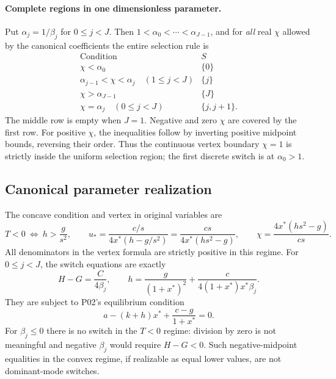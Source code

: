\paragraph{Complete regions in one dimensionless parameter.}
Put $\alpha_j=1/\beta_j$ for $0\le j<J$. Then
$1<\alpha_0<\cdots<\alpha_{J-1}$, and for \emph{all} real $\chi$
allowed by the canonical coefficients the entire selection rule is
\begin{equation}
 \begin{array}{c|c}
 \text{Condition}&S\\\hline
 \chi<\alpha_0&\{0\}\\
 \alpha_{j-1}<\chi<\alpha_j\quad(1\le j<J)&\{j\}\\
 \chi>\alpha_{J-1}&\{J\}\\
 \chi=\alpha_j\quad(0\le j<J)&\{j,j+1\}.
 \end{array}
 \label{eq:P05-regions}
\end{equation}
The middle row is empty when $J=1$. Negative and zero $\chi$ are covered
by the first row. For positive $\chi$, the inequalities follow by inverting
positive midpoint bounds, reversing their order. Thus the continuous
vertex boundary $\chi=1$ is strictly inside the uniform selection region;
the first discrete switch is at $\alpha_0>1$.

\subsection{Canonical parameter realization}

The concave condition and vertex in original variables are
\begin{equation}
 T<0\ \Longleftrightarrow\ h>\frac{g}{s^2},\qquad
 u_*=\frac{c/s}{4x^*(h-g/s^2)}
     =\frac{cs}{4x^*(hs^2-g)},\qquad
 \chi=\frac{4x^*(hs^2-g)}{cs}.
 \label{eq:P05-canonical-control}
\end{equation}
All denominators in the vertex formula are strictly positive in this
regime. For $0\le j<J$, the switch equations are exactly
\begin{equation}
 H-G=\frac{C}{4\beta_j},\qquad
 \boxed{h=\frac{g}{(1+x^*)^2}
       +\frac{c}{4(1+x^*)x^*\beta_j}.}
 \label{eq:P05-switch}
\end{equation}
They are subject to P02's equilibrium condition
\begin{equation}
 a-(k+h)x^*+\frac{c-g}{1+x^*}=0.
 \label{eq:P05-equilibrium}
\end{equation}
For $\beta_j\le0$ there is no switch in the $T<0$ regime: division
by zero is not meaningful and negative $\beta_j$ would require
$H-G<0$. Such negative-midpoint equalities in the convex regime, if
realizable as equal lower values, are not dominant-mode switches.

